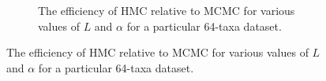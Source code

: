 \documentclass{article}
\begin{document}
\begin{figure}
\begin{subfigure}{0.45\textwidth}
            \caption{The efficiency of \ac{HMC} relative to \ac{MCMC}
                         for various values of $L$ and $\alpha$
                         for a particular 64-taxa dataset.}
        \end{subfigure}
    \end{figure}

    \printbibliography
\end{document}
